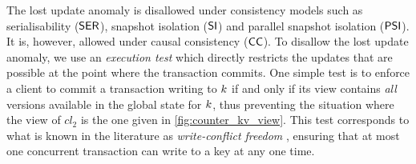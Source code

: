 The lost update anomaly is disallowed under consistency models such as
serialisability (\(\mathsf{SER}\)), snapshot isolation (\(\mathsf{SI}\)) and parallel
snapshot isolation (\(\mathsf{PSI}\)).  It is, however, allowed under causal consistency
(\(\mathsf{CC}\)). To disallow the lost update anomaly, we
use an \emph{execution test} which directly restricts the updates that
are possible at the point where the transaction commits.  One simple test
is to enforce a client to commit a transaction writing to \(k\) if
and only if its view contains {\em all} versions available in the
global state for \(k\), thus preventing the situation
where the view of $cl_2$ is the one given in \cref{fig:counter_kv_view}. 
This test corresponds to what is known in the 
literature as \emph{write-conflict freedom} \cite{framework-concur}, 
ensuring that at most one concurrent transaction can write to a key at any one time. 




